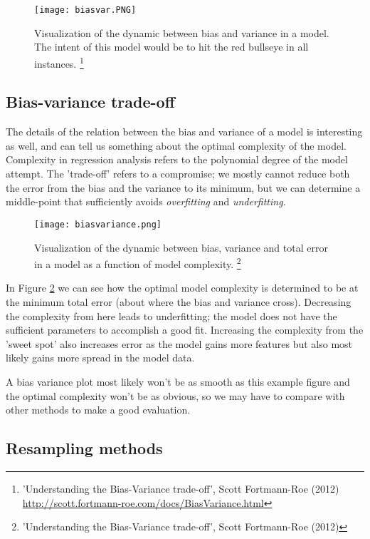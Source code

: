 \documentclass[reprint,english,notitlepage]{revtex4-1}  %
\begin{document}
\begin{figure}[h!]
    \centering
    \texttt{[image: biasvar.PNG]}
    \caption{Visualization of the dynamic between bias and variance in a model. The intent of this model would be to hit the red bullseye in all instances. \footnote{'Understanding the Bias-Variance trade-off', Scott Fortmann-Roe (2012) \url{http://scott.fortmann-roe.com/docs/BiasVariance.html}}}
    \label{fig:bv1}
\end{figure}

\subsection{Bias-variance trade-off}

The details of the relation between the bias and variance of a model is interesting as well, and can tell us something about the optimal complexity of the model. Complexity in regression analysis refers to the polynomial degree of the model attempt. The 'trade-off' refers to a compromise; we mostly cannot reduce both the error from the bias and the variance to its minimum, but we can determine a middle-point that sufficiently avoids \textit{overfitting} and \textit{underfitting}.

\begin{figure}[h!]
    \centering
    \texttt{[image: biasvariance.png]}
    \caption{Visualization of the dynamic between bias, variance and total error in a model as a function of model complexity. \footnote{'Understanding the Bias-Variance trade-off', Scott Fortmann-Roe (2012)}}
    \label{fig:bv2}
\end{figure}

In Figure \ref{fig:bv2} we can see how the optimal model complexity is determined to be at the minimum total error (about where the bias and variance cross). Decreasing the complexity from here leads to underfitting; the model does not have the sufficient parameters to accomplish a good fit. Increasing the complexity from the 'sweet spot' also increases error as the model gains more features but also most likely gains more spread in the model data.

A bias variance plot most likely won't be as smooth as this example figure and the optimal complexity won't be as obvious, so we may have to compare with other methods to make a good evaluation.

\subsection{Resampling methods}
\end{document}
